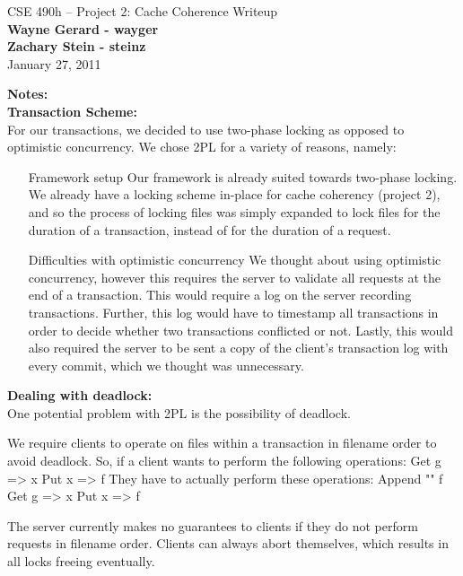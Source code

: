 \documentclass[11pt]{article}
\begin{document}
\begin{center}
{\large CSE 490h -- Project 2: Cache Coherence Writeup} \\
\textbf{Wayne Gerard - wayger} \\
\textbf{Zachary Stein - steinz} \\
January 27, 2011
\end{center}

\textbf{Notes:} \\

 
\textbf{Transaction Scheme:} \\

For our transactions, we decided to use two-phase locking as opposed to optimistic concurrency. We chose 2PL for a variety of reasons, namely:

\begin{enumerate}
\item[Framework setup] Our framework is already suited towards two-phase locking. We already have a locking scheme in-place for cache coherency (project 2), and so the process of locking files was 
simply expanded to lock files for the duration of a transaction, instead of for the duration of a request.
\item[Difficulties with optimistic concurrency] We thought about using optimistic concurrency, however this requires the server to validate all requests at the end of a transaction. This would require
a log on the server recording transactions. Further, this log would have to timestamp all transactions in order to decide whether two transactions conflicted or not. Lastly, this would also required the
server to be sent a copy of the client's transaction log with every commit, which we thought was unnecessary.
\end{enumerate}

\textbf{Dealing with deadlock:} \\

One potential problem with 2PL is the possibility of deadlock.

We require clients to operate on files within a transaction in filename order to avoid deadlock.
So, if a client wants to perform the following operations: 
	Get g => x
	Put x => f
They have to actually perform these operations:
	Append "" f
	Get g => x
	Put x => f

The server currently makes no guarantees to clients if they do not perform requests in filename order. Clients can always abort themselves, which results in all locks freeing eventually.
\end{document}

